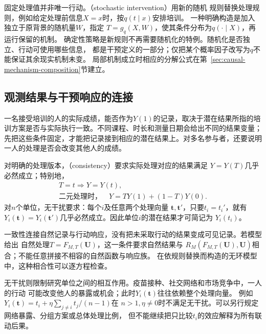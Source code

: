 固定处理值并非唯一行动。（stochastic intervention）用新的随机
规则替换处理规则，例如给定处理前信息\(X=x\)时，按\(q(t\mid x)\)安排培训。
一种明确构造是加入独立于原背景的随机量\(W\)，指定
\(T=g_q(X,W)\)，使其条件分布为\(q(\cdot\mid X)\)，再运行保留的机制。
确定性策略是新规则不再需要随机化的特例。随机化是否独立、行动可使用哪些信息，
都是干预定义的一部分；仅把某个概率因子改写为\(q\)不能保证其余现实机制未变。
局部机制成立时相应的分解公式在第~\ref{sec:causal-mechanism-composition}节建立。

\subsection{观测结果与干预响应的连接}
\label{sec:causal-response-observation-link}

一名接受培训的人的实际成绩，能否作为\(Y(1)\)的记录，取决于潜在结果所指的培训方案是否与实际执行一致。不同课程、时长和测量日期会给出不同的结果变量；先把这些条件固定，才能把记录接到相应的潜在结果上。对多名参与者，还要说明一人的处理是否会改变其他人的成绩。

\begin{definition}[处理一致性与无干扰]
  \label{def:causal-consistency-no-interference}
  对明确的处理版本，（consistency）要求实际处理对应的结果满足
  \(Y=Y(T)\)几乎必然成立；特别地，
  \begin{equation}
    \begin{gathered}
      T=t\Longrightarrow Y=Y(t),\\
      \text{二元处理时，}\quad Y=TY(1)+(1-T)Y(0).
    \end{gathered}
    \label{eq:causal-consistency}
  \end{equation}
  对\(n\)个单位，无干扰要求：每个\(i\)及任意两个处理向量
  \(\bm t,\bm t'\)，只要\(t_i=t_i'\)，就有
  \(Y_i(\bm t)=Y_i(\bm t')\)几乎必然成立。因此单位\(i\)的潜在结果才可简记为
  \(Y_i(t_i)\)。
\end{definition}

一致性连接自然记录与行动响应，没有把未采取行动的结果变成可见记录。若模型给出
自然处理\(T=F_{M,T}(\bm U)\)，这一条件要求自然结果与
\(R_M(F_{M,T}(\bm U),\bm U)\)相合；不能任意拼接不相容的自然函数与响应族。
在依规则替换而构造的无环模型中，这种相合性可以逐方程检查。

无干扰则限制研究单位之间的相互作用。疫苗接种、社交网络和市场竞争中，一人的行动
可能改变他人的暴露或机会；此时\(Y_i(\bm t)\)往往依赖整个处理向量。
例如\(Y_i(\bm t)=t_i+\eta\sum_{j\ne i}t_j/(n-1)\)在
\(n>1,\eta\ne0\)时不满足无干扰。可以另行规定网络暴露、分组方案或总体处理比例，
但不能继续把只比较\(t_i\)的效应解释为所有联动后果。

